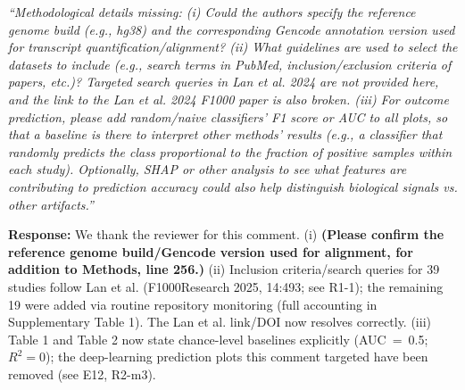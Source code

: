 \documentclass[11pt]{article}
\newcommand{\origcomment}[1]{\textit{``#1''}}
\newcommand{\filledresponse}[1]{%
  \par\medskip\noindent\textbf{Response:} #1\par
  \vspace{0.4cm}%
  \par\noindent\hrulefill\par\bigskip
}
\begin{document}
\begin{commentlist}
\item[R2-m11.] \origcomment{Methodological details missing: (i) Could the authors specify the
reference genome build (e.g., hg38) and the corresponding Gencode annotation version used for
transcript quantification/alignment? (ii) What guidelines are used to select the datasets to
include (e.g., search terms in PubMed, inclusion/exclusion criteria of papers, etc.)? Targeted
search queries in Lan et al. 2024 are not provided here, and the link to the Lan et al. 2024
F1000 paper is also broken. (iii) For outcome prediction, please add random/naive classifiers'
F1 score or AUC to all plots, so that a baseline is there to interpret other methods' results
(e.g., a classifier that randomly predicts the class proportional to the fraction of positive
samples within each study). Optionally, SHAP or other analysis to see what features are
contributing to prediction accuracy could also help distinguish biological signals vs. other
artifacts.}
\filledresponse{We thank the reviewer for this comment. (i) \textbf{(Please confirm the reference
genome build/Gencode version used for alignment, for addition to Methods, line 256.)} (ii)
Inclusion criteria/search queries for 39 studies follow Lan et al. (F1000Research 2025, 14:493;
see R1-1); the remaining 19 were added via routine repository monitoring (full accounting in
Supplementary Table 1). The Lan et al. link/DOI now resolves correctly. (iii) Table 1 and Table 2
now state chance-level baselines explicitly (AUC~=~0.5; $R^2=0$); the deep-learning prediction
plots this comment targeted have been removed (see E12, R2-m3).}

\end{commentlist}
\end{document}
